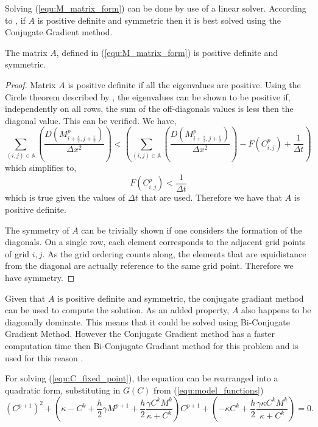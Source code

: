 Solving (\ref{equ:M_matrix_form}) can be done by use of a linear solver. 
According to \cite{barret1987templates}, if $A$ is positive definite and symmetric then it is best solved using the Conjugate Gradient method.

\begin{prop}
  The matrix $A$, defined in (\ref{equ:M_matrix_form}) is positive definite and symmetric.
\end{prop}
\begin{proof}
  Matrix $A$ is positive definite if all the eigenvalues are positive. 
  Using the Circle theorem described by \cite{gerschgorin1931uber_die_abgrenzung}, the eigenvalues can be shown to be positive if, independently on all rows, the sum of the off-diagonals values is less then the diagonal value.
  This can be verified. We have,
  \begin{equation}
    \sum_{(i,j) \in \mathbb{A}} \left( \frac{D( M^{p}_{i+\frac{s}{2}, j+\frac{r}{2}} )}{\Delta x^2} \right)
     < \left( \sum_{(i,j) \in \mathbb{A}} \left( \frac{D( M^{p}_{i+\frac{s}{2}, j+\frac{r}{2}} )}{\Delta x^2} \right) 
    - F(C^{p}_{i,j}) + \frac{1}{\Delta t} \right) 
  \end{equation}
  which simplifies to,
  \begin{equation}
    F(C^{p}_{i,j}) < \frac{1}{\Delta t}
  \end{equation}
  which is true given the values of $\Delta t$ that are used. Therefore we have that $A$ is positive definite.

  The symmetry of $A$ can be trivially shown if one considers the formation of the diagonals.
  On a single row, each element corresponds to the adjacent grid points of grid $i,j$.
  As the grid ordering counts along, the elements that are equidistance from the diagonal are actually reference to the same grid point. 
  Therefore we have symmetry. 
\end{proof} 

Given that $A$ is positive definite and symmetric, the conjugate gradiant method can be used to compute the solution.
As an added property, $A$ also happens to be diagonally dominate.
This means that it could be solved using Bi-Conjugate Gradient Method.
However the Conjugate Gradient method has a faster computation time then Bi-Conjugate Gradiant method for this problem and is used for this reason \cite{barret1987templates}.



For solving (\ref{equ:C_fixed_point}), the equation can be rearranged into a quadratic form, substituting in $G(C)$ from (\ref{equ:model_functions})
\begin{equation}
  \left(C^{p+1}\right)^2 + \left( \kappa - C^k + \frac{h}{2} \gamma M^{p+1} + \frac{h}{2} \frac{ \gamma C^k M^k}{\kappa + C^k} \right) C^{p+1} + \left( -\kappa C^k + \frac{h}{2} \frac{\gamma \kappa C^k M^k}{\kappa + C^k} \right) = 0.
\end{equation}

